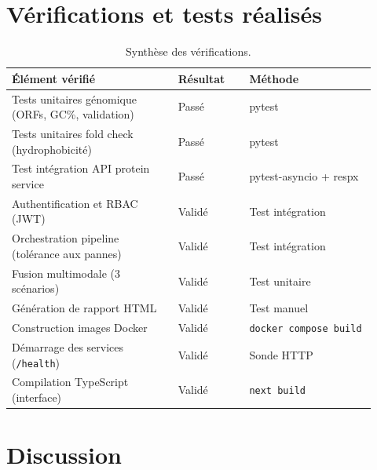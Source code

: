 \documentclass[12pt,a4paper,oneside]{book}
\begin{document}
\section{Vérifications et tests réalisés}

\begin{table}[H]
\caption{Synthèse des vérifications.}
\label{tab:tests}
\centering
\renewcommand{\arraystretch}{1.3}
\begin{tabular}{L{0.42\linewidth} C{0.18\linewidth} L{0.32\linewidth}}
\toprule
\textbf{Élément vérifié} & \textbf{Résultat} & \textbf{Méthode} \\
\midrule
Tests unitaires génomique (ORFs, GC\%, validation) & \textcolor{green!60!black}{Passé} & pytest \\
Tests unitaires fold check (hydrophobicité)        & \textcolor{green!60!black}{Passé} & pytest \\
Test intégration API protein service               & \textcolor{green!60!black}{Passé} & pytest-asyncio + respx \\
Authentification et RBAC (JWT)                     & \textcolor{green!60!black}{Validé} & Test intégration \\
Orchestration pipeline (tolérance aux pannes)      & \textcolor{green!60!black}{Validé} & Test intégration \\
Fusion multimodale (3 scénarios)                   & \textcolor{green!60!black}{Validé} & Test unitaire \\
Génération de rapport HTML                         & \textcolor{green!60!black}{Validé} & Test manuel \\
Construction images Docker                         & \textcolor{green!60!black}{Validé} & \texttt{docker compose build} \\
Démarrage des services (\texttt{/health})          & \textcolor{green!60!black}{Validé} & Sonde HTTP \\
Compilation TypeScript (interface)                 & \textcolor{green!60!black}{Validé} & \texttt{next build} \\
\bottomrule
\end{tabular}
\end{table}

\section{Discussion}
\end{document}
